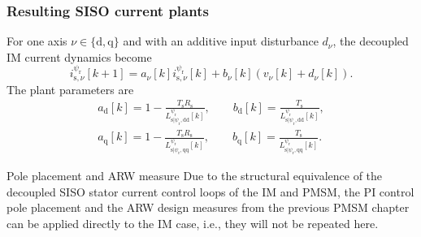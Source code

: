 \begin{frame}
    \frametitle{Resulting SISO current plants}
    For one axis $\nu\in\{\mathrm{d},\mathrm{q}\}$ and with an additive input disturbance $d_\nu$, the decoupled IM current dynamics become
    \begin{equation}
        i^{\psi_\mathrm{r}}_{\mathrm{s},\nu}[k+1]=a_\nu[k]i^{\psi_\mathrm{r}}_{\mathrm{s},\nu}[k]+b_\nu[k]\left(v_\nu[k]+d_\nu[k]\right).
        \label{eq:IM_siso_current_plant}
    \end{equation}\pause%
    The plant parameters are
    \begin{equation}
        \begin{gathered}
            a_\mathrm{d}[k]=1-\frac{T_\mathrm{s}R_\mathrm{s}}{L^{\psi_\mathrm{r}}_{\mathrm{s}|\psi_\mathrm{r},\mathrm{dd}}[k]},\qquad
            b_\mathrm{d}[k]=\frac{T_\mathrm{s}}{L^{\psi_\mathrm{r}}_{\mathrm{s}|\psi_\mathrm{r},\mathrm{dd}}[k]},\\
            a_\mathrm{q}[k]=1-\frac{T_\mathrm{s}R_\mathrm{s}}{L^{\psi_\mathrm{r}}_{\mathrm{s}|\psi_\mathrm{r},\mathrm{qq}}[k]},\qquad
            b_\mathrm{q}[k]=\frac{T_\mathrm{s}}{L^{\psi_\mathrm{r}}_{\mathrm{s}|\psi_\mathrm{r},\mathrm{qq}}[k]}.
        \end{gathered}
    \end{equation}\pause%
    \vspace{-0.3cm}
    \begin{varblock}{Pole placement and ARW measure}
        Due to the structural equivalence of the decoupled SISO stator current control loops of the IM and PMSM, the PI control pole placement and the ARW design measures from the previous PMSM chapter can be applied directly to the IM case, i.e., they will not be repeated here.
    \end{varblock}
\end{frame}



